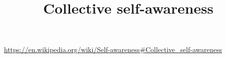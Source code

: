 \documentclass[a4paper]{article}
\title{Collective self-awareness}
\date{}
\begin{document}
    \maketitle
    \url{https://en.wikipedia.org/wiki/Self-awareness#Collective_self-awareness}
\end{document}
